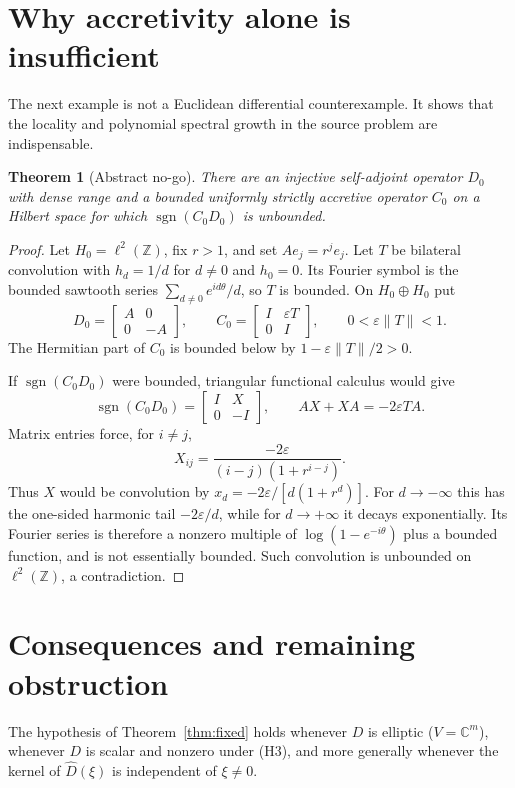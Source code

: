 \documentclass[11pt]{article}
\newtheorem{theorem}{Theorem}
\newcommand{\sgn}{\operatorname{sgn}}
\begin{document}
\section*{Why accretivity alone is insufficient}
The next example is not a Euclidean differential counterexample. It shows
that the locality and polynomial spectral growth in the source problem are
indispensable.

\begin{theorem}[Abstract no-go]\label{thm:nogo}
There are an injective self-adjoint operator $D_0$ with dense range and a
bounded uniformly strictly accretive operator $C_0$ on a Hilbert space for
which $\sgn(C_0D_0)$ is unbounded.
\end{theorem}

\begin{proof}
Let $H_0=\ell^2(\mathbb Z)$, fix $r>1$, and set
$Ae_j=r^je_j$. Let $T$ be bilateral convolution with
$h_d=1/d$ for $d\neq0$ and $h_0=0$. Its Fourier symbol is the bounded
sawtooth series $\sum_{d\neq0}e^{id\theta}/d$, so $T$ is bounded. On
$H_0\oplus H_0$ put
\[
 D_0=\begin{bmatrix}A&0\\0&-A\end{bmatrix},\qquad
 C_0=\begin{bmatrix}I&\varepsilon T\\0&I\end{bmatrix},
 \qquad 0<\varepsilon\|T\|<1.
\]
The Hermitian part of $C_0$ is bounded below by
$1-\varepsilon\|T\|/2>0$.

If $\sgn(C_0D_0)$ were bounded, triangular functional calculus would give
\[
 \sgn(C_0D_0)=\begin{bmatrix}I&X\\0&-I\end{bmatrix},
 \qquad AX+XA=-2\varepsilon TA.
\]
Matrix entries force, for $i\neq j$,
\[
 X_{ij}=\frac{-2\varepsilon}{(i-j)(1+r^{i-j})}.
\]
Thus $X$ would be convolution by
$x_d=-2\varepsilon/[d(1+r^d)]$. For $d\to-\infty$ this has the one-sided
harmonic tail $-2\varepsilon/d$, while for $d\to+\infty$ it decays
exponentially. Its Fourier series is therefore a nonzero multiple of
$\log(1-e^{-i\theta})$ plus a bounded function, and is not essentially
bounded. Such convolution is unbounded on $\ell^2(\mathbb Z)$, a
contradiction.
\end{proof}

\section*{Consequences and remaining obstruction}
The hypothesis of Theorem~\ref{thm:fixed} holds whenever $D$ is elliptic
($V=\mathbb C^m$), whenever $D$ is scalar and nonzero under (H3), and more
generally whenever the kernel of $\widehat D(\xi)$ is independent of
$\xi\ne0$.
\end{document}
